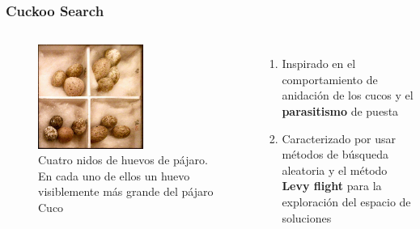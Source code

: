 \begin{frame}
  \frametitle{Cuckoo Search}
  \begin{columns}
    \begin{figure}
      \begin{center}
        \includegraphics[width=0.6\textwidth]{imagenes/chapter3/cucko_eggs.jpg}
      \end{center}
      \caption{Cuatro nidos de huevos de pájaro. En cada uno de ellos un huevo visiblemente más grande del pájaro Cuco \footnotemark[6]}
    \end{figure}
    \begin{enumerate}
      \item Inspirado en el comportamiento de anidación de los cucos y el \textbf{parasitismo} de puesta
      \item Caracterizado por usar métodos de búsqueda aleatoria y el método \textbf{Levy flight} para la exploración del espacio de soluciones
    \end{enumerate}
  \end{columns}
\end{frame}

